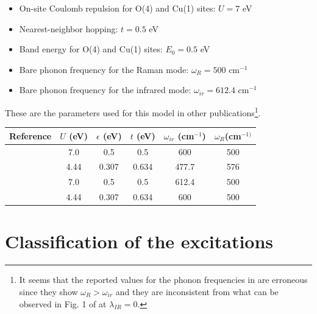 \begin{itemize}
\item On-site Coulomb repulsion for O(4) and Cu(1) sites: $U=7$ eV
\item Nearest-neighbor hopping: $t=0.5$ eV
\item Band energy for O(4) and Cu(1) sites: $E_0=0.5$ eV
\item Bare phonon frequency for the Raman mode: $\omega_R=500$ cm$^{-1}$
\item Bare phonon frequency for the infrared mode: $\omega_{ir}=612.4$ cm$^{-1}$
\end{itemize}

These are the parameters used for this model in other publications\footnote{It seems that the reported values for the phonon frequencies in \cite{Salkola1994, Salkola1995} are erroneous since they show $\omega_R > \omega_{ir}$ and they are inconsistent from what can be observed in Fig. 1 of \cite{Salkola1994} at $\lambda_{IR}=0$.}.

\noindent\begin{tabular}{| l | c | c | c | c | c |}
\hline
Reference & $U$ (eV) & $\epsilon$ (eV) & $t$ (eV) & $\omega_{ir}$ (cm$^{-1}$) & $\omega_R$(cm$^{-1)}$ \\
\hline
\cite{MustredeLeon1992} & 7.0 & 0.5 & 0.5 & 600 & 500 \\ 
\cite{Salkola1994, Salkola1995} & 4.44 & 0.307 & 0.634 & 477.7 & 576  \\
\cite{Mena2006,DeLeon1999, Leon2008, MirandaMena2007} & 7.0 & 0.5 & 0.5 & 612.4 & 500 \\ 
\cite{MustredeLeon2000} & 4.44 & 0.307 & 0.634 & 600 & 500 \\
\hline
\end{tabular}

\section{Classification of the excitations}
\label{sec:classification}


